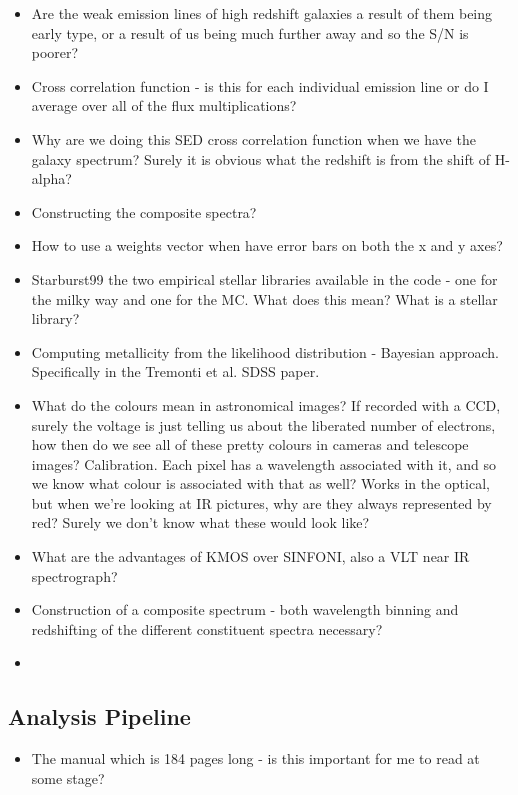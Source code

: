 \documentclass{literature}
\begin{document}
\begin{itemize}
	\item Are the weak emission lines of high redshift galaxies a result of them being early type, or a result of us being much further away and so the S/N is poorer? 
	\item Cross correlation function - is this for each individual emission line or do I average over all of the flux multiplications?
	\item Why are we doing this SED cross correlation function when we have the galaxy spectrum? Surely it is obvious what the redshift is from the shift of H-alpha?
	\item Constructing the composite spectra?
	\item How to use a weights vector when have error bars on both the x and y axes? 
	\item Starburst99 the two empirical stellar libraries available in the code - one for the milky way and one for the MC. What does this mean? What is a stellar library?
	\item Computing metallicity from the likelihood distribution - Bayesian approach. Specifically in the Tremonti et al. SDSS paper.
	\item What do the colours mean in astronomical images? If recorded with a CCD, surely the voltage is just telling us about the liberated number of electrons, how then do we see all of these pretty colours in cameras and telescope images? Calibration. Each pixel has a wavelength associated with it, and so we know what colour is associated with that as well? Works in the optical, but when we're looking at IR pictures, why are they always represented by red? Surely we don't know what these would look like? 
	\item What are the advantages of KMOS over SINFONI, also a VLT near IR spectrograph?
	\item Construction of a composite spectrum - both wavelength binning and redshifting of the different constituent spectra necessary?
	\item 

\end{itemize}

\subsection{Analysis Pipeline}\label{que:analysis_pipeline}
\begin{itemize}
	\item The manual which is 184 pages long - is this important for me to read at some stage?
\end{itemize}


\clearpage 

%

\end{document}
